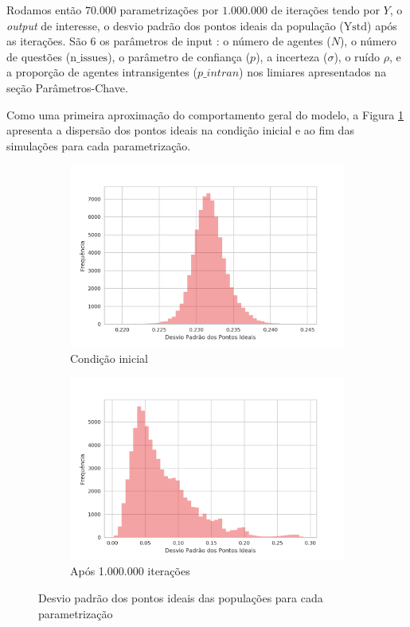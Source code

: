 
Rodamos então \(70.000\) parametrizações por \(1.000.000\) de iterações tendo
por \(Y\), o \textit{output} de interesse, o desvio padrão  dos pontos ideais da
população (\(\text{Ystd}\)) após as iterações. São \(6\) os parâmetros de input
: o número de agentes (\(N\)), o número de questões (\(\text{n\_issues}\)), o
parâmetro de confiança (\(p\)), a incerteza (\(\sigma\)),  o ruído \(\rho\), e a
proporção de agentes intransigentes (\(p\_intran\)) nos
limiares apresentados na seção Parâmetros-Chave.

Como uma primeira aproximação do comportamento geral do modelo, a Figura
\ref{fig:hists1} apresenta a dispersão dos pontos ideais na condição inicial e
ao fim das simulações para cada parametrização.

\begin{figure}[h]
    \centering
    \begin{subfigure}[b]{0.49\textwidth}
      \includegraphics[width=\textwidth]{ims/diststdinit.png}
      \caption{Condição inicial}
    \end{subfigure}
    \begin{subfigure}[b]{0.49\textwidth}
      \includegraphics[width=\textwidth]{ims/distY.png}
       \caption{Após 1.000.000 iterações}
      \end{subfigure}
      \caption{Desvio padrão dos pontos ideais das populações para cada parametrização}
      \label{fig:hists1}
    \end{figure}
    

